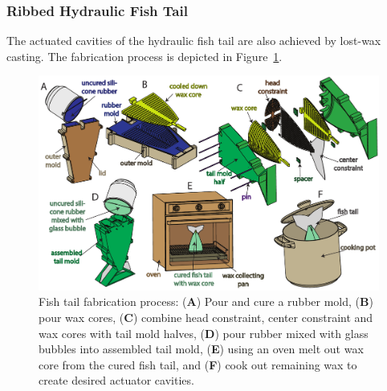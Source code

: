 \subsubsection{Ribbed Hydraulic Fish Tail}
\label{subsubsec:Fabrication, Lost Wax Casting, Ribbed Hydraulic Fish Tail}
The actuated cavities of the hydraulic fish tail are also achieved by lost-wax casting. The fabrication process is depicted in Figure~\ref{fig:fabrication}.
\begin{figure}
        \centering
         \includegraphics[width=0.99\columnwidth]{figures/fabrication/fab_hydraulic_fish_tail.pdf}
         \caption[Fish tail fabrication process]{Fish tail fabrication process: (\textbf{A}) Pour and cure a rubber mold, (\textbf{B}) pour wax cores, (\textbf{C}) combine head constraint, center constraint and wax cores with tail mold halves, (\textbf{D}) pour rubber mixed with glass bubbles into assembled tail mold, (\textbf{E}) using an oven melt out wax core from the cured fish tail, and (\textbf{F}) cook out remaining wax to create desired actuator cavities.}\label{fig:fabrication}
\end{figure}

